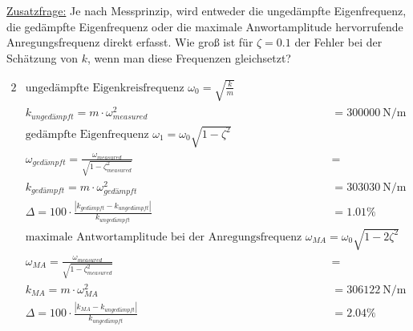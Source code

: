 \underline{Zusatzfrage:} Je nach Messprinzip, wird entweder die ungedämpfte
Eigenfrequenz, die gedämpfte Eigenfrequenz oder die maximale Anwortamplitude
hervorrufende Anregungsfrequenz direkt erfasst. Wie groß ist für $\zeta = 0.1$ der
Fehler bei der Schätzung von $k$, wenn man diese Frequenzen gleichsetzt?

\begin{solution}
    \begin{alignat*}{2}
        &\text{ungedämpfte Eigenkreisfrequenz  } \omega_0 = \sqrt{\frac{k}{m}} \\
        &k_{ungedämpft} = m \cdot \omega_{measured}^2 &&= \SI{300000}{\newton \per \meter} \\
        &\text{gedämpfte Eigenfrequenz  } \omega_1 = \omega_0 \sqrt{1-\zeta^2} \\
        &\omega_{gedämpft} = \frac{\omega_{measured}}{\sqrt{1-\zeta_{measured}^2}} &&= \\
        &k_{gedämpft} = m \cdot \omega_{gedämpft}^2 &&= \SI{303030}{\newton \per \meter}\\
        &\Delta = 100 \cdot \frac{|k_{gedämpft} - k_{ungedämpft}|}{k_{ungedämpft}} &&= 1.01 \%\\
        &\text{maximale Antwortamplitude bei der Anregungsfrequenz  } \omega_{MA} = \omega_0 \sqrt{1-2 \zeta^2} \\
        &\omega_{MA} = \frac{\omega_{measured}}{\sqrt{1-\zeta_{measured}^2}} &&= \\
        &k_{MA} = m \cdot \omega_{MA}^2 &&= \SI{306122}{\newton \per \meter}\\
        &\Delta = 100 \cdot \frac{|k_{MA} - k_{ungedämpft}|}{k_{ungedämpft}} &&= 2.04 \% \\ 
    \end{alignat*}
\end{solution}


